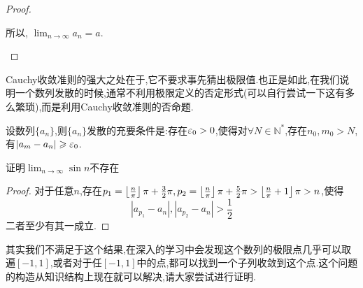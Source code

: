 \begin{proof}
\begin{enumerate}
            所以, $\lim_{n \to \infty} a_n = a$.




    \end{enumerate}
\end{proof}

Cauchy收敛准则的强大之处在于,它不要求事先猜出极限值.也正是如此,在我们说明一个数列发散的时候,通常不利用极限定义的否定形式(可以自行尝试一下这有多么繁琐),而是利用Cauchy收敛准则的否命题.

\begin{proposition}[Cachuy收敛准则的否命题]
    设数列$\{a_n\}$,则$\{a_n\}$发散的充要条件是:存在$\ve_0 >0$,使得对$\forall N\in \mathbb{N}^*$,存在$n_0,m_0>N$,有$|a_m-a_n|\ges \ve_0$.
\end{proposition}

\begin{example}
    证明$\lim_{n \to \infty} \sin n $不存在
    \begin{proof}
        对于任意$n$,存在$p_1 = \left\lfloor  \frac n{\pi} \right\rfloor \pi +\frac32\pi,p_2 = \llfloor\frac n{\pi}\rrfloor\pi+\frac52\pi > \llfloor\frac{n}{\pi}+1\rrfloor\pi >n$,使得$$|a_{p_1}-a_n| , |a_{p_2}-a_n|>\frac12$$二者至少有其一成立.

    \end{proof}

\end{example}
\begin{remark}
    其实我们不满足于这个结果,在深入的学习中会发现这个数列的极限点几乎可以取遍$[-1,1]$,或者对于任$[-1,1]$中的点,都可以找到一个子列收敛到这个点.这个问题的构造从知识结构上现在就可以解决,请大家尝试进行证明.
\end{remark}

